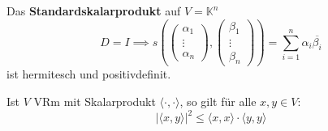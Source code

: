 \documentclass[parskip,a4paper,twoside,DIV15,BCOR12mm]{scrbook}
\begin{document}
\begin{example}
Das \textbf{Standardskalarprodukt} auf $V=\mathbb{K}^n$
\[D=I \implies s(\begin{pmatrix}\alpha_1\\\vdots\\\alpha_n \end{pmatrix},
\begin{pmatrix}\beta_1\\\vdots\\\beta_n \end{pmatrix})=\sum_{i=1}^n \alpha_i\overline{\beta_i}\]
ist hermitesch und positivdefinit.
\end{example}

\begin{theo}
Ist $V$ VRm mit Skalarprodukt $\langle\cdot,\cdot\rangle$, so gilt für alle $x,y\in V$:
\[|\langle x,y\rangle|^2 \le \langle x,x\rangle \cdot \langle y,y\rangle\]
\end{theo}
\end{document}
